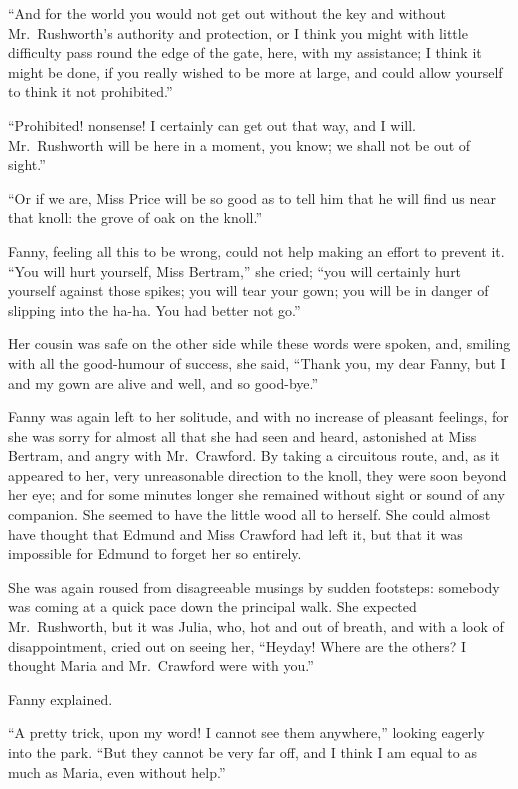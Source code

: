 \documentclass{article}
\begin{document}
``And for the world you would not get out without the key
and without Mr.\ Rushworth's authority and protection,
or I think you might with little difficulty pass round
the edge of the gate, here, with my assistance; I think it
might be done, if you really wished to be more at large,
and could allow yourself to think it not prohibited.''

``Prohibited! nonsense!  I certainly can get out that way,
and I will.  Mr.\ Rushworth will be here in a moment,
you know; we shall not be out of sight.''

``Or if we are, Miss Price will be so good as to tell him
that he will find us near that knoll:  the grove of oak
on the knoll.''

Fanny, feeling all this to be wrong, could not help
making an effort to prevent it.  ``You will hurt yourself,
Miss Bertram,'' she cried; ``you will certainly hurt
yourself against those spikes; you will tear your gown;
you will be in danger of slipping into the ha-ha. You had
better not go.''

Her cousin was safe on the other side while these words
were spoken, and, smiling with all the good-humour
of success, she said, ``Thank you, my dear Fanny,
but I and my gown are alive and well, and so good-bye.''

Fanny was again left to her solitude, and with no increase
of pleasant feelings, for she was sorry for almost all
that she had seen and heard, astonished at Miss Bertram,
and angry with Mr.\ Crawford.  By taking a circuitous
route, and, as it appeared to her, very unreasonable
direction to the knoll, they were soon beyond her eye;
and for some minutes longer she remained without sight
or sound of any companion.  She seemed to have the little
wood all to herself.  She could almost have thought
that Edmund and Miss Crawford had left it, but that
it was impossible for Edmund to forget her so entirely.

She was again roused from disagreeable musings by sudden footsteps:
somebody was coming at a quick pace down the principal walk.
She expected Mr.\ Rushworth, but it was Julia, who,
hot and out of breath, and with a look of disappointment,
cried out on seeing her, ``Heyday!  Where are the others?
I thought Maria and Mr.\ Crawford were with you.''

Fanny explained.

``A pretty trick, upon my word!  I cannot see them anywhere,''
looking eagerly into the park.  ``But they cannot be very
far off, and I think I am equal to as much as Maria,
even without help.''
\end{document}
